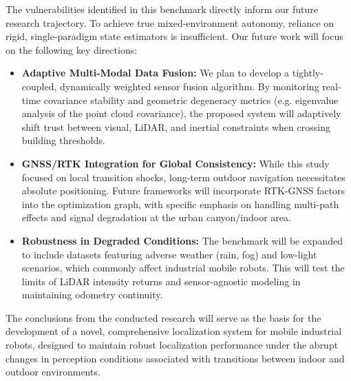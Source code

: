 \documentclass[pdflatex,sn-mathphys-num]{sn-jnl}
\theoremstyle{thmstyleone}%
\theoremstyle{thmstyletwo}%
\theoremstyle{thmstylethree}%
\begin{document}
The vulnerabilities identified in this benchmark directly inform our future research trajectory. To achieve true mixed-environment autonomy, reliance on rigid, single-paradigm state estimators is insufficient. Our future work will focus on the following key directions:
\begin{itemize}
    \item \textbf{Adaptive Multi-Modal Data Fusion:} We plan to develop a tightly-coupled, dynamically weighted sensor fusion algorithm. By monitoring real-time covariance stability and geometric degeneracy metrics (e.g. eigenvalue analysis of the point cloud covariance), the proposed system will adaptively shift trust between visual, LiDAR, and inertial constraints when crossing building thresholds.
    \item \textbf{GNSS/RTK Integration for Global Consistency:} While this study focused on local transition shocks, long-term outdoor navigation necessitates absolute positioning. Future frameworks will incorporate RTK-GNSS factors into the optimization graph, with specific emphasis on handling multi-path effects and signal degradation at the urban canyon/indoor area.
    \item \textbf{Robustness in Degraded Conditions:} The benchmark will be expanded to include datasets featuring adverse weather (rain, fog) and low-light scenarios, which commonly affect industrial mobile robots. This will test the limits of LiDAR intensity returns and sensor-agnostic modeling in maintaining odometry continuity.
\end{itemize}
The conclusions from the conducted research will serve as the basis for the development of a novel, comprehensive localization system for mobile industrial robots, designed to maintain robust localization performance under the abrupt changes in perception conditions associated with transitions between indoor and outdoor environments.

\backmatter




\end{document}
